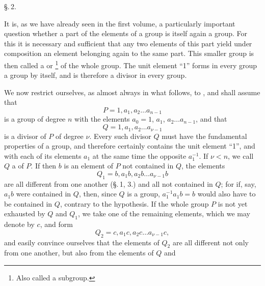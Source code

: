 
\begin{center}
\S.\,2.

\end{center}

It is, as we have already seen in the first volume, a particularly important question whether a part of the elements of a group is itself again a group. For this it is necessary and sufficient that any two elements of this part yield under composition an element belonging again to the same part. This smaller group is then called a  or \footnote{Also called a subgroup.} of the whole group. The unit element ``1'' forms in every group a group by itself, and is therefore a divisor in every group.

We now restrict ourselves, as almost always in what follows, to , and shall assume that
\[
P = 1, a_1, a_2 \ldots a_{n-1}
\]
is a group of degree $n$ with the elements $a_0 = 1$, $a_1$, $a_2 \ldots a_{n-1}$, and that
\[
Q = 1, a_1, a_2 \ldots a_{\nu-1}
\]
is a divisor of $P$ of degree $\nu$. Every such divisor $Q$ must have the fundamental properties of a group, and therefore certainly contains the unit element ``1'', and with each of its elements $a_1$ at the same time the opposite $a_1^{-1}$. If $\nu < n$, we call $Q$ a  of $P$. If then $b$ is an element of $P$ not contained in $Q$, the elements
\[
Q_1 = b, a_1 b, a_2 b \ldots a_{\nu-1} b
\]
are all different from one another (\S.\,1, 3.) and all not contained in $Q$; for if, say, $a_1 b$ were contained in $Q$, then, since $Q$ is a group, $a_1^{-1} a_1 b = b$ would also have to be contained in $Q$, contrary to the hypothesis. If the whole group $P$ is not yet exhausted by $Q$ and $Q_1$, we take one of the remaining elements, which we may denote by $c$, and form
\[
Q_2 = c, a_1 c, a_2 c \ldots a_{\nu-1} c,
\]
and easily convince ourselves that the elements of $Q_2$ are all different not only from one another, but also from the elements of $Q$ and
